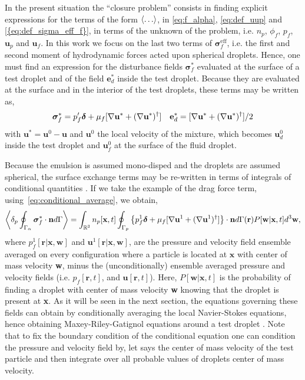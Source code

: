 In the present situation the ``closure problem'' consists in finding explicit expressions for the terms of the form $\left<\ldots\right>$, in \ref{eq:f_alpha}, \ref{eq:def_uup} and \ref{{eq:def_sigma_eff_f}}, in terms of the unknown of the problem, i.e. $n_p$, $\phi_f$, $p_f$, $\textbf{u}_p$ and $\textbf{u}_f$. 
In this work we focus on the last two terms of $\bm\sigma^\text{eff}_f$, i.e. the first and second moment of hydrodynamic forces acted upon spherical droplets.
Hence, one must find an expression for the disturbance fields $\bm\sigma_f^*$ evaluated at the surface of a test droplet and of the field $\textbf{e}_d^*$ inside the test droplet. 
Because they are evaluated at the surface and in the interior of the test droplets, these terms may be written as, 
\begin{align}
    \bm\sigma_f^* =p_f' \bm\delta 
    + \mu_f [\grad \textbf{u}^* + (\grad \textbf{u}^*)^\dagger]
    && 
    \textbf{e}_d^* = [\grad \textbf{u}^* + (\grad \textbf{u}^*)^\dagger] /2
    \label{eq:conditional_average}
\end{align}
with $\textbf{u}^* = \textbf{u}^0 - \textbf{u}$ and $\textbf{u}^0$ the local velocity of the mixture, which becomes $\textbf{u}_d^0$ inside the test droplet and $\textbf{u}_f^0$ at the surface of the fluid droplet. 

Because the emulsion is assumed mono-disped and the droplets are assumed spherical, the surface exchange terms may be re-written in terms of integrals of conditional quantities \citep{lhuillier1992ensemble}. 
If we take the example of the drag force term, using~\ref{eq:conditional_average}, we obtain, 
\begin{equation}
    \pSavg{\bm\sigma^*_f\cdot \textbf{n}}
    =
    \int_{\mathbb{R}^3} n_p[\textbf{x},t]\intS[p]{
        \left\{
            p_f^1 \bm\delta 
    + \mu_f [\grad \textbf{u}^1 + (\grad \textbf{u}^1)^\dagger]
        \right\}\cdot \textbf{n}
    }(\textbf{r})  P[\textbf{w}|\textbf{x},t]
    d^3 \textbf{w},
    \label{eq:conditional_average}
\end{equation}
where $p_f^1[\textbf{r}|\textbf{x},\textbf{w}]$ and $\textbf{u}^1[\textbf{r}|\textbf{x},\textbf{w}]$, are the pressure and velocity field ensemble averaged on every configuration where a particle is located at $\textbf{x}$ with center of mass velocity \textbf{w}, minus the (unconditionally) ensemble averaged  pressure and velocity fields (i.e. $p_f[\textbf{r},t]$, and $\textbf{u}[\textbf{r},t]$).
Here, $ P[\textbf{w}|\textbf{x},t]$ is the probability of finding a droplet with center of mass velocity \textbf{w} knowing that the droplet is present at \textbf{x}. 
As it will be seen in the next section, the equations governing these fields can obtain by conditionally averaging the local Navier-Stokes equations, hence obtaining Maxey-Riley-Gatignol equations around a test droplet \citep{fintzi2025}. 
Note that to fix the boundary condition of the conditional equation one can condition the pressure and velocity field by, let says the center of mass velocity of the test particle and then integrate over all probable values of droplets center of mass velocity. 


